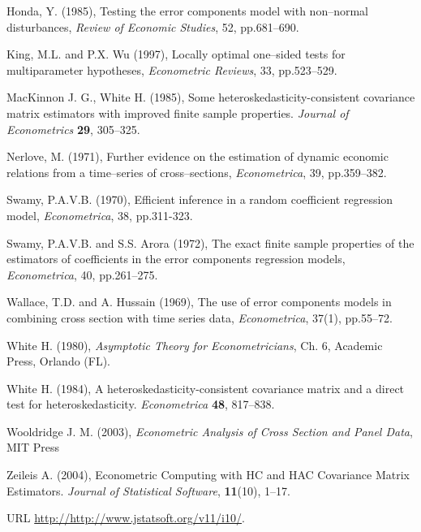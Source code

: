 \documentclass[a4paper]{article}
\begin{document}
  Honda, Y. (1985), Testing the error components model with non--normal
  disturbances, \emph{Review of Economic Studies}, 52, pp.681--690.

  King, M.L. and P.X. Wu (1997), Locally optimal one--sided tests for
  multiparameter hypotheses, \emph{Econometric Reviews}, 33,
  pp.523--529.

  MacKinnon J. G., White H. (1985), Some heteroskedasticity-consistent
covariance matrix estimators with improved finite sample properties.
\emph{Journal of Econometrics} \textbf{29}, 305--325.

  Nerlove, M. (1971), Further evidence on the estimation of dynamic
  economic relations from a time--series of cross--sections,
  \emph{Econometrica}, 39, pp.359--382.

  Swamy, P.A.V.B. (1970), Efficient inference in a random coefficient
  regression model, \emph{Econometrica}, 38, pp.311-323.

  
  Swamy, P.A.V.B. and S.S. Arora (1972), The exact finite sample
  properties of the estimators of coefficients in the error components
  regression models, \emph{Econometrica}, 40, pp.261--275.

  Wallace, T.D. and A. Hussain (1969), The use of error components
  models in combining cross section with time series data,
  \emph{Econometrica}, 37(1), pp.55--72.

  White H. (1980), \emph{Asymptotic Theory for Econometricians}, Ch. 6, Academic Press, Orlando (FL).

  White H. (1984), A heteroskedasticity-consistent covariance matrix and
a direct test for heteroskedasticity. \emph{Econometrica} \textbf{48},
817--838.

  Wooldridge J. M. (2003), \emph{Econometric Analysis of Cross Section and Panel Data}, MIT Press

  Zeileis A. (2004), Econometric Computing with HC and HAC Covariance Matrix
Estimators. \emph{Journal of Statistical Software}, \textbf{11}(10), 1--17.

URL \url{http://http://www.jstatsoft.org/v11/i10/}.
\end{document}
